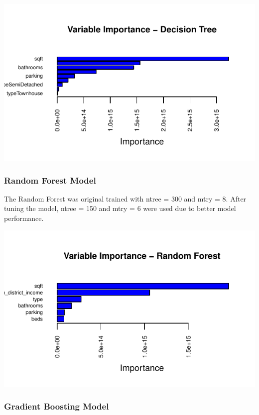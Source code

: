 \documentclass[11pt,]{article}
\begin{document}
\begin{center}\includegraphics{House_prices_report_files/figure-latex/Decision Tree Model-1} \end{center}

\hypertarget{random-forest-model}{%
\subsubsection{Random Forest Model}\label{random-forest-model}}

The Random Forest was original trained with ntree = 300 and mtry = 8.
After tuning the model, ntree = 150 and mtry = 6 were used due to better
model performance.

\begin{center}\includegraphics{House_prices_report_files/figure-latex/Random Forest Model-1} \end{center}

\hypertarget{gradient-boosting-model}{%
\subsubsection{Gradient Boosting Model}\label{gradient-boosting-model}}
\end{document}
